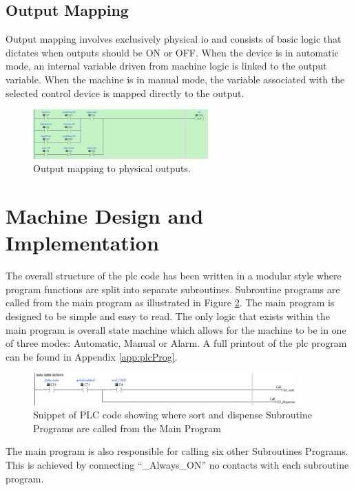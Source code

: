     \subsection{Output Mapping} \label{sec:output}
        Output mapping involves exclusively physical \acrshort{io} and consists of basic logic that dictates when outputs should be ON or OFF. When the device is in automatic mode, an internal variable driven from machine logic is linked to the output variable. When the machine is in manual mode, the variable associated with the selected control device is mapped directly to the output. 

        \begin{figure}[H]
            \centering
            \includegraphics[width = 0.6\textwidth]{2_images/outputMapping}
            \caption{Output mapping to physical outputs.}
            \label{fig:outputMapping}
        \end{figure}        

\section{Machine Design and Implementation}
    The overall structure of the \acrshort{plc} code has been written in a modular style where program functions are split into separate subroutines. Subroutine programs are called from the main program as illustrated in Figure \ref{fig:plcMainAuto}. The main program is designed to be simple and easy to read. The only logic that exists within the main program is overall state machine which allows for the machine to be in one of three modes: Automatic, Manual or Alarm. A full printout of the \acrshort{plc} program can be found in Appendix \ref{app:plcProg}.

        \begin{figure}[H]
            \centering
            \includegraphics[width = 0.9\textwidth]{2_images/plcMainAuto}
            \caption{Snippet of PLC code showing where sort and dispense Subroutine Programs are called from the Main Program}
            \label{fig:plcMainAuto}
        \end{figure}
    The main program is also responsible for calling six other Subroutines Programs. This is achieved by connecting   ``\_Always\_ON'' \acrshort{no} contacts with each subroutine program.
    
